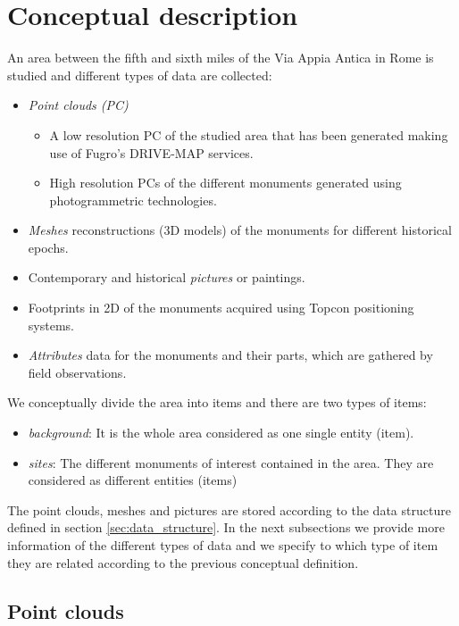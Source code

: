 \section{Conceptual description}
\label{sec:concept_descr}

An area between the fifth and sixth miles of the Via Appia Antica in Rome is studied and different types of data are collected:
\begin{itemize} 
\item {\em Point clouds (PC)}
    \begin{itemize} 
    \item A low resolution PC of the studied area that has been generated making
    use of Fugro's DRIVE-MAP services.
    \item High resolution PCs of the different monuments generated using photogrammetric technologies.
    \end{itemize}
\item {\em Meshes} reconstructions (3D models) of the monuments for different historical epochs.
\item Contemporary and historical {\em pictures} or paintings.
\item Footprints in 2D of the monuments acquired using Topcon positioning systems. 
\item {\em Attributes} data for the monuments and their parts, which are gathered
by field observations.
\end{itemize}

We conceptually divide the area into items and there are two types of items:
\begin{itemize}
\item \textit{background}: It is the whole area considered as one single entity (item).
\item \textit{sites}: The different monuments of interest contained in the area. They are considered as different entities (items)
\end{itemize}

The point clouds, meshes and pictures are stored according to the data
structure defined in section \ref{sec:data_structure}. In the next subsections we provide more information of the different types of data and we specify to which type of item they are related according to the previous conceptual definition. 

\subsection{Point clouds}

